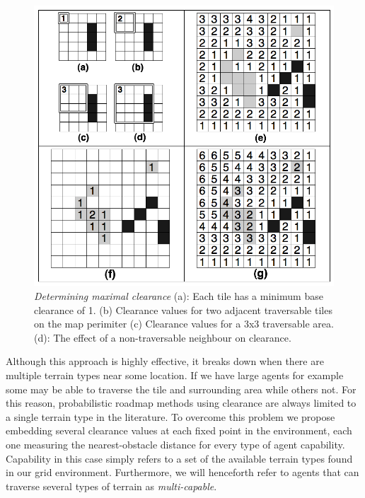 \begin{figure}[htbp]
        \caption{\emph{Determining maximal clearance} (a): Each tile has a minimum base clearance of 1. (b) Clearance values for two adjacent traversable tiles on the map perimiter (c) Clearance values for a 3x3 traversable area. (d): The effect of a non-traversable neighbour on clearance. }
        \begin{center}
                        \includegraphics[scale=0.5]{diagrams/calculatingclearance.png}
        \end{center}
        \label{aha-fig:calculatingclearance}
\end{figure}

Although this approach is highly effective, it breaks down when there are multiple terrain types near some location. If we have large agents for example some may be able to traverse the tile and surrounding area while others not. For this reason, probabilistic roadmap methods using clearance are always limited to a single terrain type in the literature. To overcome this problem we propose embedding several clearance values at each fixed point in the environment, each one measuring the nearest-obstacle distance for every type of agent capability.  Capability in this case simply refers to a set of the available terrain types found in our grid environment. Furthermore, we will henceforth refer to agents that can traverse several types of terrain as \emph{multi-capable}.

